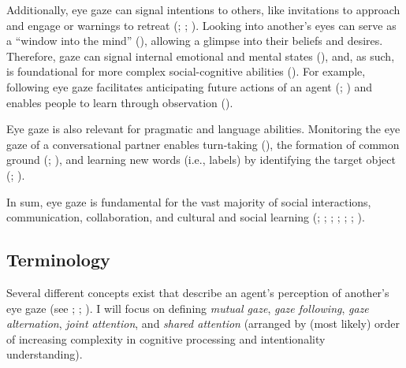 \documentclass[
]{scrbook}
\begin{document}
Additionally, eye gaze can signal intentions to others, like invitations to approach and engage or warnings to retreat (; ; ). Looking into another's eyes can serve as a ``window into the mind'' (), allowing a glimpse into their beliefs and desires. Therefore, gaze can signal internal emotional and mental states (), and, as such, is foundational for more complex social-cognitive abilities (). For example, following eye gaze facilitates anticipating future actions of an agent (; ) and enables people to learn through observation ().

Eye gaze is also relevant for pragmatic and language abilities. Monitoring the eye gaze of a conversational partner enables turn-taking (), the formation of common ground (; ), and learning new words (i.e., labels) by identifying the target object (; ).

In sum, eye gaze is fundamental for the vast majority of social interactions, communication, collaboration, and cultural and social learning (; ; ; ; ; ; ).

\subsection{Terminology}\label{terminology-1}

Several different concepts exist that describe an agent's perception of another's eye gaze (see ; ; ). I will focus on defining \emph{mutual gaze}, \emph{gaze following}, \emph{gaze alternation}, \emph{joint attention}, and \emph{shared attention} (arranged by (most likely) order of increasing complexity in cognitive processing and intentionality understanding).
\end{document}
